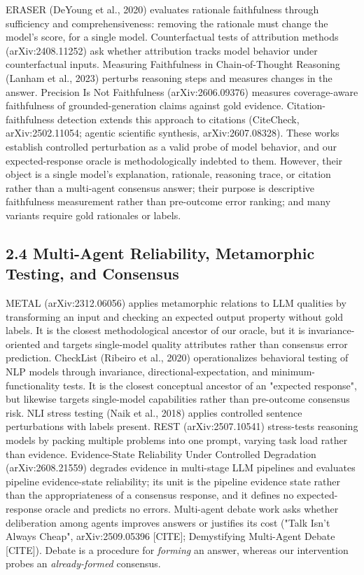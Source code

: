 \documentclass[11pt]{article}
\begin{document}
ERASER (DeYoung et al., 2020) evaluates rationale faithfulness through sufficiency and comprehensiveness: removing the rationale must change the model's score, for a single model. Counterfactual tests of attribution methods (arXiv:2408.11252) ask whether attribution tracks model behavior under counterfactual inputs. Measuring Faithfulness in Chain-of-Thought Reasoning (Lanham et al., 2023) perturbs reasoning steps and measures changes in the answer. Precision Is Not Faithfulness (arXiv:2606.09376) measures coverage-aware faithfulness of grounded-generation claims against gold evidence. Citation-faithfulness detection extends this approach to citations (CiteCheck, arXiv:2502.11054; agentic scientific synthesis, arXiv:2607.08328). These works establish controlled perturbation as a valid probe of model behavior, and our expected-response oracle is methodologically indebted to them. However, their object is a single model's explanation, rationale, reasoning trace, or citation rather than a multi-agent consensus answer; their purpose is descriptive faithfulness measurement rather than pre-outcome error ranking; and many variants require gold rationales or labels.

\subsection{2.4 Multi-Agent Reliability, Metamorphic Testing, and Consensus}

METAL (arXiv:2312.06056) applies metamorphic relations to LLM qualities by transforming an input and checking an expected output property without gold labels. It is the closest methodological ancestor of our oracle, but it is invariance-oriented and targets single-model quality attributes rather than consensus error prediction. CheckList (Ribeiro et al., 2020) operationalizes behavioral testing of NLP models through invariance, directional-expectation, and minimum-functionality tests. It is the closest conceptual ancestor of an "expected response", but likewise targets single-model capabilities rather than pre-outcome consensus risk. NLI stress testing (Naik et al., 2018) applies controlled sentence perturbations with labels present. REST (arXiv:2507.10541) stress-tests reasoning models by packing multiple problems into one prompt, varying task load rather than evidence. Evidence-State Reliability Under Controlled Degradation (arXiv:2608.21559) degrades evidence in multi-stage LLM pipelines and evaluates pipeline evidence-state reliability; its unit is the pipeline evidence state rather than the appropriateness of a consensus response, and it defines no expected-response oracle and predicts no errors. Multi-agent debate work asks whether deliberation among agents improves answers or justifies its cost ("Talk Isn't Always Cheap", arXiv:2509.05396 [CITE]; Demystifying Multi-Agent Debate [CITE]). Debate is a procedure for \emph{forming} an answer, whereas our intervention probes an \emph{already-formed} consensus.
\end{document}
